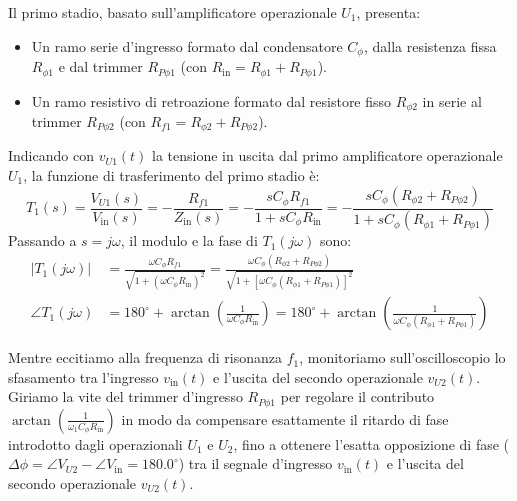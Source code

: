 \documentclass[11pt,a4paper]{article}
\begin{document}
\vspace{0.3cm}

\newpage

\noindent Il primo stadio, basato sull'amplificatore operazionale $U_1$, presenta:
\begin{itemize}
    \item Un ramo serie d'ingresso formato dal condensatore $C_\phi$, dalla resistenza fissa $R_{\phi 1}$ e dal trimmer $R_{P\phi 1}$ (con $R_{\text{in}} = R_{\phi 1} + R_{P\phi 1}$).
    \item Un ramo resistivo di retroazione formato dal resistore fisso $R_{\phi 2}$ in serie al trimmer $R_{P\phi 2}$ (con $R_{f1} = R_{\phi 2} + R_{P\phi 2}$).
\end{itemize}
Indicando con $v_{U1}(t)$ la tensione in uscita dal primo amplificatore operazionale $U_1$, la funzione di trasferimento del primo stadio è:
\begin{equation}
    \label{eq:T1_laplace}
    T_1(s) = \frac{V_{U1}(s)}{V_{\text{in}}(s)} = -\frac{R_{f1}}{Z_{\text{in}}(s)} = -\frac{s C_\phi R_{f1}}{1 + s C_\phi R_{\text{in}}} = -\frac{s C_\phi \left(R_{\phi 2} + R_{P\phi 2}\right)}{1 + s C_\phi \left(R_{\phi 1} + R_{P\phi 1}\right)}
\end{equation}
Passando a $s = j\omega$, il modulo e la fase di $T_1(j\omega)$ sono:
\begin{align}
    \label{eq:T1_modulo}
    |T_1(j\omega)| &= \frac{\omega C_\phi R_{f1}}{\sqrt{1 + \left(\omega C_\phi R_{\text{in}}\right)^2}} = \frac{\omega C_\phi \left(R_{\phi 2} + R_{P\phi 2}\right)}{\sqrt{1 + \left[\omega C_\phi \left(R_{\phi 1} + R_{P\phi 1}\right)\right]^2}} \\[6pt]
    \label{eq:T1_fase}
    \angle T_1(j\omega) &= 180^\circ + \arctan\left(\frac{1}{\omega C_\phi R_{\text{in}}}\right) = 180^\circ + \arctan\left(\frac{1}{\omega C_\phi \left(R_{\phi 1} + R_{P\phi 1}\right)}\right)
\end{align}

\noindent Mentre eccitiamo alla frequenza di risonanza $f_1$, monitoriamo sull'oscilloscopio lo sfasamento tra l'ingresso $v_{\text{in}}(t)$ e l'uscita del secondo operazionale $v_{U2}(t)$. Giriamo la vite del trimmer d'ingresso $R_{P\phi 1}$ per regolare il contributo $\arctan\left(\frac{1}{\omega_1 C_\phi R_{\text{in}}}\right)$ in modo da compensare esattamente il ritardo di fase introdotto dagli operazionali $U_1$ e $U_2$, fino a ottenere l'esatta opposizione di fase ($\Delta\phi = \angle V_{U2} - \angle V_{\text{in}} = 180.0^\circ$) tra il segnale d'ingresso $v_{\text{in}}(t)$ e l'uscita del secondo operazionale $v_{U2}(t)$.
\end{document}
